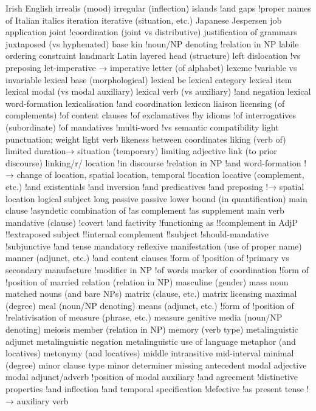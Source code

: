 Irish English
irrealis (mood)
irregular (inflection)
islands
!and gaps
!proper names of
Italian
italics
iteration
iterative (situation, etc.)
Japanese
Jespersen
job application
joint
!coordination (joint vs distributive)
justification of grammars
juxtaposed (vs hyphenated) base
kin
!noun/NP denoting
!relation in NP
labile ordering constraint
landmark
Latin
layered head (structure)
left dislocation
!vs preposing
let-imperative → imperative
letter (of alphabet)
lexeme
!variable vs invariable
lexical base (morphological)
lexical be
lexical category
lexical item
lexical modal (vs modal auxiliary)
lexical verb (vs auxiliary)
!and negation
lexical word-formation
lexicalisation
!and coordination
lexicon
liaison
licensing (of complements)
!of content clauses
!of exclamatives
!by idioms
!of interrogatives (subordinate)
!of mandatives
!multi-word
!vs semantic compatibility
light punctuation; weight
light verb
likeness between coordinates
liking (verb of)
limited duration→ situation (temporary)
limiting adjective
link (to prior discourse)
linking/r/
location
!in discourse
!relation in NP
!and word-formation
!→ change of location, spatial location, temporal
!location
locative (complement, etc.)
!and existentials
!and inversion
!and predicatives
!and preposing
!→ spatial location
logical subject
long passive passive
lower bound (in quantification)
main clause
!asyndetic combination of
!as complement
!as supplement
main verb
mandative (clause)
!covert
!and factivity
!functioning as
!!complement in AdjP
!!extraposed subject
!!internal complement
!!subject
!should-mandative
!subjunctive
!and tense
mandatory reflexive
manifestation (use of proper name)
manner (adjunct, etc.)
!and content clauses
!form of
!position of
!primary vs secondary
manufacture
!modifier in NP
!of words
marker of coordination
!form of
!position of
married relation (relation in NP)
masculine (gender)
mass noun
matched nouns (and bare NPs)
matrix (clause, etc.)
matrix licensing
maximal (degree)
meal (noun/NP denoting)
means (adjunct, etc.)
!form of
!position of
!relativisation of
measure (phrase, etc.)
measure genitive
media (noun/NP denoting)
meiosis
member (relation in NP)
memory (verb type)
metalinguistic adjunct
metalinguistic negation
metalinguistic use of language
metaphor (and locatives)
metonymy (and locatives)
middle intransitive
mid-interval
minimal (degree)
minor clause type
minor determiner
missing antecedent
modal adjective
modal adjunct/adverb
!position of
modal auxiliary
!and agreement
!distinctive properties
!and inflection
!and temporal specification
!defective
!as present tense
!→ auxiliary verb
